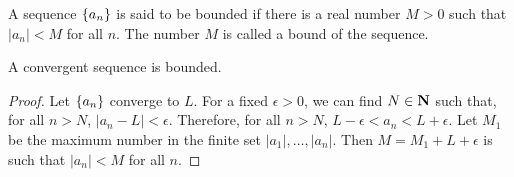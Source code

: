 \begin{defn}\label{c5s1d5}
A sequence $\{a_n\}$ is said to be bounded if there is a real number $M>0$
such that $|a_n| < M$ for all $n$. The number $M$ is called a bound of the
sequence.
\end{defn}

\begin{prop}\label{c5s1p6}
A convergent sequence is bounded.
\end{prop}
\begin{proof}
Let $\{a_n\}$ converge to $L$. For a fixed $\epsilon > 0$, we can find
$N \in \mathbf{N}$ such that, for all $n > N$, $|a_n - L| < \epsilon$. Therefore,
for all $n > N$, $L - \epsilon < a_n < L + \epsilon$. Let $M_1$ be the 
maximum number in the finite set $|a_1|, \ldots, |a_n|$. Then $M = M_1 + 
L + \epsilon$ is such that $|a_n| < M$ for all $n$.
\end{proof}
